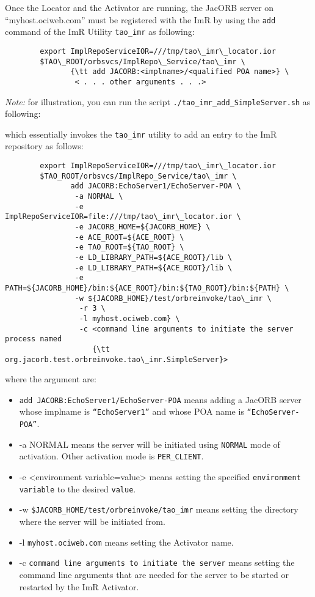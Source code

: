 Once the Locator and the Activator are running, the JacORB server on
“myhost.ociweb.com” must be registered with the ImR by using the
{\tt add} command of the ImR Utility {\tt tao\_imr} as following:

\begin{verbatim}
        export ImplRepoServiceIOR=///tmp/tao\_imr\_locator.ior
        $TAO\_ROOT/orbsvcs/ImplRepo\_Service/tao\_imr \
               {\tt add JACORB:<implname>/<qualified POA name>} \
                < . . . other arguments . . .>
\end{verbatim}

\emph{Note:} for illustration, you can run the script
{\tt ./tao\_imr\_add\_SimpleServer.sh} as following:


which essentially invokes the {\tt tao\_imr} utility to add an entry to
the ImR repository as follows:

\begin{verbatim}
        export ImplRepoServiceIOR=///tmp/tao\_imr\_locator.ior
        $TAO_ROOT/orbsvcs/ImplRepo_Service/tao\_imr \
               add JACORB:EchoServer1/EchoServer-POA \
                -a NORMAL \
                -e ImplRepoServiceIOR=file:///tmp/tao\_imr\_locator.ior \
                -e JACORB_HOME=${JACORB_HOME} \
                -e ACE_ROOT=${ACE_ROOT} \
                -e TAO_ROOT=${TAO_ROOT} \
                -e LD_LIBRARY_PATH=${ACE_ROOT}/lib \
                -e LD_LIBRARY_PATH=${ACE_ROOT}/lib \
                -e PATH=${JACORB_HOME}/bin:${ACE_ROOT}/bin:${TAO_ROOT}/bin:${PATH} \
                -w ${JACORB_HOME}/test/orbreinvoke/tao\_imr \
                 -r 3 \
                 -l myhost.ociweb.com} \
                 -c <command line arguments to initiate the server process named
                    {\tt org.jacorb.test.orbreinvoke.tao\_imr.SimpleServer}>
\end{verbatim}

where the argument are:
\begin{itemize}
    \item {\tt add JACORB:EchoServer1/EchoServer-POA} means
             adding a JacORB server whose implname is {\tt “EchoServer1”}
             and whose POA name is {\tt “EchoServer-POA”}.
    \item -a NORMAL means the server will be initiated using
             {\tt NORMAL} mode of activation.  Other activation mode
              is {\tt PER\_CLIENT}.
    \item -e <environment variable=value> means setting the specified
              {\tt environment variable} to the desired {\tt value}.
    \item -w {\tt \${JACORB\_HOME}/test/orbreinvoke/tao\_imr} means setting
               the directory where the server will be initiated from.
    \item -l {\tt myhost.ociweb.com} means setting the Activator name.
    \item -c {\tt command line arguments to initiate the server} means
               setting the command line arguments that are needed for the server
               to be started or restarted by the ImR Activator.
\end{itemize}

